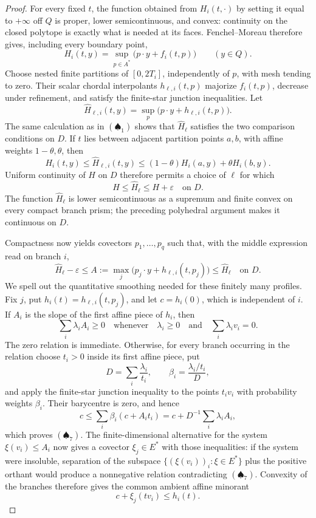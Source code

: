 \begin{proof}
For every fixed \(t\), the function obtained from \(H_i(t,\cdot)\) by
setting it equal to \(+\infty\) off \(Q\) is proper, lower semicontinuous,
and convex: continuity on the closed polytope is exactly what is needed at
its faces.  Fenchel--Moreau therefore gives, including every boundary point,
\[
 H_i(t,y)=\sup_{p\in A^*}
               \bigl(p\mathbin\cdot y+f_i(t,p)\bigr)
 \qquad (y\in Q).
 \tag{\(\spadesuit_2\)}
\]
Choose nested finite partitions of \([0,2T_i]\), independently of \(p\),
with mesh tending to zero.  Their scalar chordal interpolants
\(h_{\ell,i}(t,p)\) majorize \(f_i(t,p)\), decrease under refinement, and
satisfy the finite-star junction inequalities.  Let
\[
 \widehat H_{\ell,i}(t,y)=
 \sup_p\bigl(p\mathbin\cdot y+h_{\ell,i}(t,p)\bigr).
 \tag{\(\spadesuit_3\)}
\]
The same calculation as in \((\spadesuit_1)\) shows that
\(\widehat H_\ell\) satisfies the two comparison conditions on \(D\).  If
\(t\) lies between adjacent
partition points \(a,b\), with affine weights \(1-\theta,\theta\), then
\[
 H_i(t,y)\leq\widehat H_{\ell,i}(t,y)
 \leq(1-\theta)H_i(a,y)+\theta H_i(b,y).
 \tag{\(\spadesuit_4\)}
\]
Uniform continuity of \(H\) on \(D\) therefore permits a choice of
\(\ell\) for which
\[
                       H\leq\widehat H_\ell\leq H+\varepsilon
 \quad\text{on }D.
 \tag{\(\spadesuit_5\)}
\]
The function \(\widehat H_\ell\) is lower semicontinuous as a supremum and
finite convex on every compact branch prism; the preceding polyhedral
argument makes it continuous on \(D\).

Compactness now yields covectors \(p_1,\ldots,p_q\) such that, with the
middle expression read on branch \(i\),
\[
 \widehat H_\ell-\varepsilon
 \leq A:=\max_j\bigl(p_j\mathbin\cdot y+h_{\ell,i}(t,p_j)\bigr)
 \leq\widehat H_\ell
 \quad\text{on }D.
 \tag{\(\spadesuit_6\)}
\]
We spell out the quantitative smoothing needed for these finitely many
profiles.  Fix $j$, put $h_i(t)=h_{\ell,i}(t,p_j)$, and let
$c=h_i(0)$, which is independent of $i$.  If $A_i$ is the slope of
the first affine piece of $h_i$, then
\[
 \sum_i\lambda_iA_i\geq0
 \quad\text{whenever}\quad
 \lambda_i\geq0\quad\text{and}\quad\sum_i\lambda_iv_i=0.
 \tag{$\spadesuit_7$}
\]
The zero relation is immediate.  Otherwise, for every branch occurring in
the relation choose $t_i>0$ inside
its first affine piece, put
\[
 D=\sum_i\frac{\lambda_i}{t_i},
 \qquad
 \beta_i=\frac{\lambda_i/t_i}{D},
\]
and apply the finite-star junction inequality to the points $t_iv_i$ with
probability weights $\beta_i$.  Their barycentre is zero, and hence
\[
 c\leq\sum_i\beta_i(c+A_it_i)
   =c+D^{-1}\sum_i\lambda_iA_i,
\]
which proves $(\spadesuit_7)$.  The finite-dimensional alternative for the
system $\xi(v_i)\leq A_i$ now gives a covector $\xi_j\in E^*$ with those
inequalities: if the system were insoluble, separation of the subspace
$\{(\xi(v_i))_i:\xi\in E^*\}$ plus the positive orthant would produce
a nonnegative relation contradicting $(\spadesuit_7)$.  Convexity of the
branches therefore gives the common ambient affine minorant
\[
                   c+\xi_j(tv_i)\leq h_i(t).
 \tag{$\spadesuit_8$}
\]


\end{proof}
